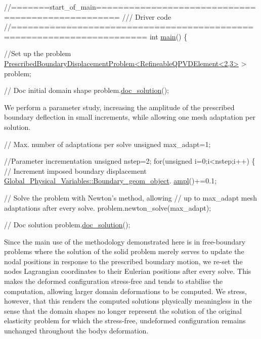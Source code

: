  
\begin{DoxyCodeInclude}
\textcolor{comment}{//=======start\_of\_main==================================================}
\textcolor{comment}{/// Driver code}
\textcolor{comment}{}\textcolor{comment}{//======================================================================}
\textcolor{keywordtype}{int} \hyperlink{prescribed__displ__lagr__mult_8cc_ae66f6b31b5ad750f1fe042a706a4e3d4}{main}()
\{
 
 \textcolor{comment}{//Set up the problem}
 \hyperlink{classPrescribedBoundaryDisplacementProblem}{PrescribedBoundaryDisplacementProblem<RefineableQPVDElement<2,3>}
       > problem;
 
 \textcolor{comment}{// Doc initial domain shape}
 problem.\hyperlink{classPrescribedBoundaryDisplacementProblem_abc58821d6b49cd9773dcd90b240aab6e}{doc\_solution}();

\end{DoxyCodeInclude}


We perform a parameter study, increasing the amplitude of the prescribed boundary deflection in small increments, while allowing one mesh adaptation per solution.


\begin{DoxyCodeInclude}

 \textcolor{comment}{// Max. number of adaptations per solve}
 \textcolor{keywordtype}{unsigned} max\_adapt=1;

 \textcolor{comment}{//Parameter incrementation}
 \textcolor{keywordtype}{unsigned} nstep=2; 
 \textcolor{keywordflow}{for}(\textcolor{keywordtype}{unsigned} i=0;i<nstep;i++)
  \{
   \textcolor{comment}{// Increment imposed boundary displacement}
   \hyperlink{namespaceGlobal__Physical__Variables_ab0a184463cbaaa353f2235411adef3c4}{Global\_Physical\_Variables::Boundary\_geom\_object}.
      \hyperlink{classWarpedLine_ae43c2f997b9c0de62783375341ac5794}{ampl}()+=0.1;

   \textcolor{comment}{// Solve the problem with Newton's method, allowing}
   \textcolor{comment}{// up to max\_adapt mesh adaptations after every solve.}
   problem.newton\_solve(max\_adapt);
   
   \textcolor{comment}{// Doc solution}
   problem.\hyperlink{classPrescribedBoundaryDisplacementProblem_abc58821d6b49cd9773dcd90b240aab6e}{doc\_solution}();

\end{DoxyCodeInclude}


Since the main use of the methodology demonstrated here is in free-\/boundary problems where the solution of the solid problem merely serves to update the nodal positions in response to the prescribed boundary motion, we re-\/set the nodes\textquotesingle{} Lagrangian coordinates to their Eulerian positions after every solve. This makes the deformed configuration stress-\/free and tends to stabilise the computation, allowing larger domain deformations to be computed. We stress, however, that this renders the computed solutions physically meaningless in the sense that the domain shapes no longer represent the solution of the original elasticity problem for which the stress-\/free, undeformed configuration remains unchanged throughout the body\textquotesingle{}s deformation.


